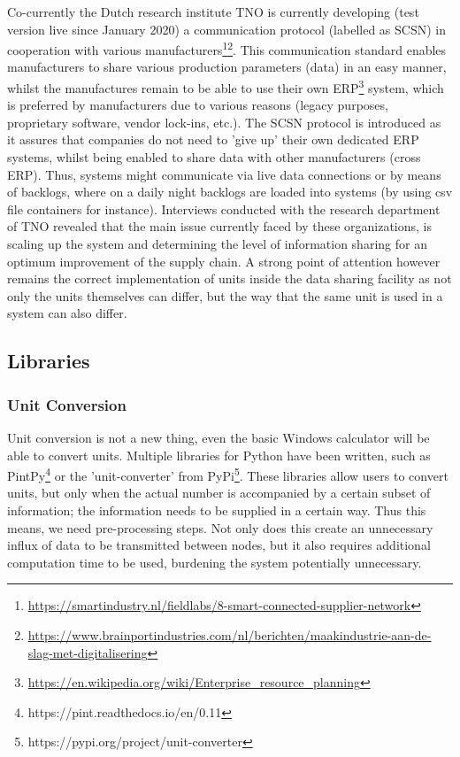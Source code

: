 \documentclass[sigchi, nonacm]{acmart}
\begin{document}
Co-currently the Dutch research institute TNO is currently developing (test version live since January 2020) a communication protocol (labelled as SCSN) in cooperation with various manufacturers\footnote{\url{https://smartindustry.nl/fieldlabs/8-smart-connected-supplier-network}}\footnote{\url{https://www.brainportindustries.com/nl/berichten/maakindustrie-aan-de-slag-met-digitalisering}}. This communication standard enables manufacturers to share various production parameters (data) in an easy manner, whilst the manufactures remain to be able to use their own ERP\footnote{\url{https://en.wikipedia.org/wiki/Enterprise_resource_planning}} system, which is preferred by manufacturers due to various reasons (legacy purposes, proprietary software, vendor lock-ins, etc.). The SCSN protocol is introduced as it assures that companies do not need to 'give up' their own dedicated ERP systems, whilst being enabled to share data with other manufacturers (cross ERP). Thus, systems might communicate via live data connections or by means of backlogs, where on a daily night backlogs are loaded into systems (by using csv file containers for instance).
Interviews conducted with the research department of TNO revealed that the main issue currently faced by these organizations, is scaling up the system and determining the level of information sharing for an optimum improvement of the supply chain. A strong point of attention however remains the correct implementation of units inside the data sharing facility as not only the units themselves can differ, but the way that the same unit is used in a system can also differ.


\subsection{Libraries}
    \subsubsection{Unit Conversion} Unit conversion is not a new thing, even the basic Windows calculator will be able to convert units. Multiple libraries for Python have been written, such as PintPy\footnote{https://pint.readthedocs.io/en/0.11} or the 'unit-converter' from PyPi\footnote{https://pypi.org/project/unit-converter}. These libraries allow users to convert units, but only when the actual number is accompanied by a certain subset of information; the information needs to be supplied in a certain way. Thus this means, we need pre-processing steps. Not only does this create an unnecessary influx of data to be transmitted between nodes, but it also requires additional computation time to be used, burdening the system potentially unnecessary.
\end{document}
